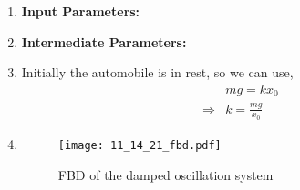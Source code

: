 \documentclass[journal,12pt,twocolumn]{IEEEtran}
\theoremstyle{remark}
\begin{document}
\begin{enumerate}
\item \textbf{Input Parameters:}
\begin{table}[h]
    
\end{table}
\item \textbf{Intermediate Parameters:}
\begin{table}[h]

\end{table}

\item{}
    Initially the automobile is in rest, so we can use,
    \begin{align}
&mg = kx_0 \\
\Rightarrow &k=\frac{mg}{x_0}
    \end{align}

\item{}
\begin{figure}[h]
        \centering
        \texttt{[image: 11\_14\_21\_fbd.pdf]}
        \caption{FBD of the damped oscillation system}
        \label{fig:enter-label}
    \end{figure}


\end{enumerate}
\end{document}

